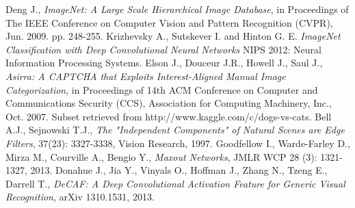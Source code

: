 \documentclass[journal]{IEEEtran}
\begin{document}
\begin{thebibliography}{1}
Deng J., \emph{ImageNet: A Large Scale Hierarchical Image Database},
in Proceedings of The IEEE Conference on Computer Vision and Pattern 
Recognition (CVPR), Jun. 2009. pp. 248-255.
Krizhevsky A., Sutskever I. and Hinton G. E.
\emph{ImageNet Classification with Deep Convolutional Neural Networks}
NIPS 2012: Neural Information Processing Systems.
Elson J., Douceur J.R., Howell  J., Saul J., \emph{Asirra: A CAPTCHA 
that Exploits Interest-Aligned Manual Image Categorization}, in 
Proceedings of 14th ACM Conference on Computer and Communications Security 
(CCS), Association for Computing Machinery, Inc., Oct. 2007.
Subset retrieved from http://www.kaggle.com/c/dogs-vs-cats. 
Bell A.J., Sejnowski T.J., \emph{The "Independent Components" of Natural Scenes
are Edge Filters}, 37(23): 3327-3338, Vision Research, 1997.
Goodfellow I., Warde-Farley D., Mirza M., Courville A., Bengio Y., 
\emph{Maxout Networks}, JMLR WCP 28 (3): 1321-1327, 2013.
Donahue J., Jia Y., Vinyals O., Hoffman J., Zhang N., Tzeng E., Darrell T., 
\emph{DeCAF: A Deep Convolutional Activation Feature for Generic 
Visual Recognition}, arXiv 1310.1531, 2013.
\end{thebibliography}




\enlargethispage{-5in}
\end{document}
